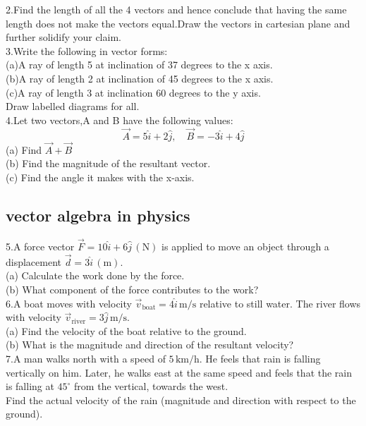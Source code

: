\documentclass[12pt]{article}
\begin{document}
2.Find the length of all the 4 vectors and hence conclude that having the same length does not make the vectors equal.Draw the vectors in cartesian plane and further solidify your claim.\\

3.Write the following in vector forms:\\
(a)A ray of length 5 at inclination of 37 degrees to the x axis.\\
(b)A ray of length 2 at inclination of 45 degrees to the x axis.\\
(c)A ray of length 3 at inclination 60 degrees to the y axis.\\
Draw labelled diagrams for all.\\

4.Let two vectors,A and B have the following values:
\[
\vec{A} = 5\hat{i} + 2\hat{j}, \quad \vec{B} = -3\hat{i} + 4\hat{j}
\]
(a) Find \( \vec{A} + \vec{B} \) \\
(b) Find the magnitude of the resultant vector. \\
(c) Find the angle it makes with the x-axis.\\

\subsection{vector algebra in physics}
5.A force vector \( \vec{F} = 10\hat{i} + 6\hat{j} \, (\text{N}) \) is applied to move an object through a displacement \( \vec{d} = 3\hat{i} \, (\text{m}) \). \\
(a) Calculate the work done by the force. \\
(b) What component of the force contributes to the work?\\

6.A boat moves with velocity \( \vec{v}_\text{boat} = 4\hat{i} \, \text{m/s} \) relative to still water. The river flows with velocity \( \vec{v}_\text{river} = 3\hat{j} \, \text{m/s} \). \\
(a) Find the velocity of the boat relative to the ground. \\
(b) What is the magnitude and direction of the resultant velocity?\\

7.A man walks north with a speed of \( 5 \, \text{km/h} \). He feels that rain is falling vertically on him. Later, he walks east at the same speed and feels that the rain is falling at \( 45^\circ \) from the vertical, towards the west. \\
Find the actual velocity of the rain (magnitude and direction with respect to the ground).\\
\end{document}
